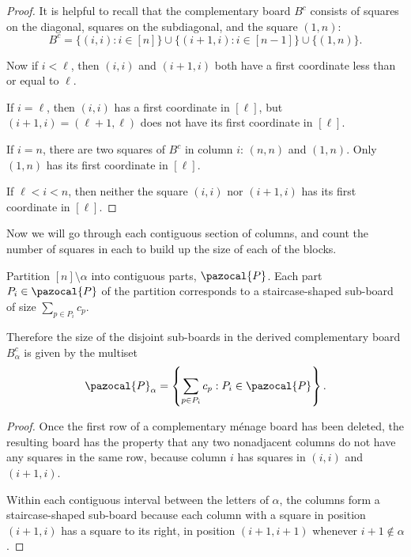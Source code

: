 \begin{proof}
  It is helpful to recall that the complementary board $B^c$ consists of squares
  on the diagonal, squares on the subdiagonal, and the square $(1, n)$:
  \begin{equation}
    B^c = \{(i, i) : i \in [n]\} \cup \{(i + 1, i) : i \in [n-1]\} \cup \{(1,n)\}.
  \end{equation}

  Now if $i < \ell$, then $(i,i)$ and $(i + 1, i)$ both have a first coordinate
  less than or equal to $\ell$.

  If $i = \ell$, then $(i, i)$ has a first coordinate in $[\ell]$, but
  $(i + 1, i) = (\ell + 1, \ell)$ does not have its first coordinate in $[\ell]$.

  If $i = n$, there are two squares of $B^c$ in column $i$: $(n, n)$ and $(1, n)$.
  Only $(1,n)$ has its first coordinate in $[\ell]$.

  If $\ell < i < n$, then neither the square $(i, i)$ nor $(i+1, i)$ has
  its first coordinate in $[\ell]$.
\end{proof}

Now we will go through each contiguous section of columns, and count the number
of squares in each to build up the size of each of the blocks.

\begin{lemma}
  Partition $[n] \setminus \alpha$ into contiguous parts, $\pazocal{P}$.
  Each part $P_i \in \pazocal{P}$ of the partition corresponds to a staircase-shaped
  sub-board of size $\sum_{p \in P_i} c_p$.

  Therefore the size of the disjoint sub-boards in the derived complementary
  board $B_\alpha^c$ is given by the multiset \begin{equation}
    \pazocal{P}_\alpha = \left\{ \sum_{p \in P_i} c_p : P_i \in \pazocal{P} \right\}.
  \end{equation}
\label{lem:subBoardSizes}
\end{lemma}

\begin{proof}
  Once the first row of a complementary m\'enage board has been deleted,
  the resulting board has the property that any two nonadjacent columns
  do not have any squares in the same row, because column $i$ has
  squares in $(i, i)$ and $(i+1, i)$.

  Within each contiguous interval between the letters of $\alpha$,
  the columns form a staircase-shaped sub-board because
  each column with a square in position $(i + 1, i)$ has a square to its right,
  in position $(i + 1, i + 1)$ whenever $i + 1 \not\in \alpha$.
\end{proof}

